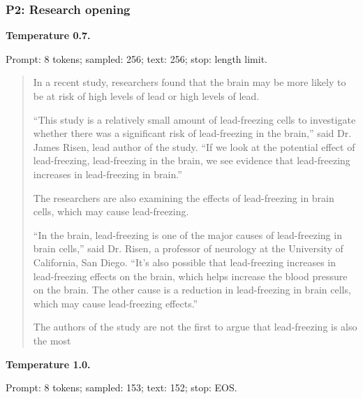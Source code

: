 \subsubsection{P2: Research opening}


\textbf{Temperature 0.7.}

{\footnotesize Prompt: 8 tokens; sampled: 256; text: 256; stop: length limit.}

\begin{quote}\small

In a recent study, researchers found that the brain may be more likely to be at risk of high levels of lead or high levels of lead.

``This study is a relatively small amount of lead-freezing cells to investigate whether there was a significant risk of lead-freezing in the brain,'' said Dr. James Risen, lead author of the study. ``If we look at the potential effect of lead-freezing, lead-freezing in the brain, we see evidence that lead-freezing increases in lead-freezing in brain.''

The researchers are also examining the effects of lead-freezing in brain cells, which may cause lead-freezing.

``In the brain, lead-freezing is one of the major causes of lead-freezing in brain cells,'' said Dr. Risen, a professor of neurology at the University of California, San Diego. ``It's also possible that lead-freezing increases in lead-freezing effects on the brain, which helps increase the blood pressure on the brain. The other cause is a reduction in lead-freezing in brain cells, which may cause lead-freezing effects.''

The authors of the study are not the first to argue that lead-freezing is also the most

\end{quote}


\textbf{Temperature 1.0.}

{\footnotesize Prompt: 8 tokens; sampled: 153; text: 152; stop: EOS.}

